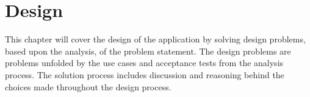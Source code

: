 \chapter{Design}
This chapter will cover the design of the application by solving design problems, based upon the analysis, of the problem statement. The design problems are problems unfolded by the use cases and acceptance tests from the analysis process. The solution process includes discussion and reasoning behind the choices made throughout the design process. 









